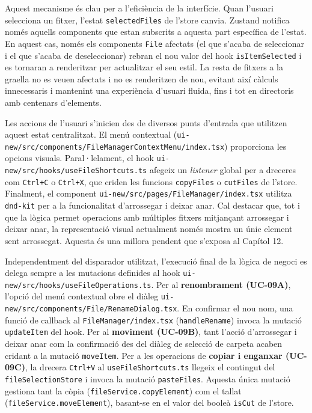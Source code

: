 Aquest mecanisme és clau per a l'eficiència de la interfície. Quan l'usuari selecciona un fitxer, l'estat \texttt{selectedFiles} de l'store canvia. Zustand notifica només aquells components que estan subscrits a aquesta part específica de l'estat. En aquest cas, només els components \texttt{File} afectats (el que s'acaba de seleccionar i el que s'acaba de deseleccionar) rebran el nou valor del hook \texttt{isItemSelected} i es tornaran a renderitzar per actualitzar el seu estil. La resta de fitxers a la graella no es veuen afectats i no es renderitzen de nou, evitant així càlculs innecessaris i mantenint una experiència d'usuari fluida, fins i tot en directoris amb centenars d'elements.

Les accions de l'usuari s'inicien des de diversos punts d'entrada que utilitzen aquest estat centralitzat. El menú contextual (\texttt{ui-new/src/components/FileManagerContextMenu/index.tsx}) proporciona les opcions visuals. Paral·lelament, el hook \texttt{ui-new/src/hooks/useFileShortcuts.ts} afegeix un \textit{listener} global per a dreceres com \texttt{Ctrl+C} o \texttt{Ctrl+X}, que criden les funcions \texttt{copyFiles} o \texttt{cutFiles} de l'store. Finalment, el component \texttt{ui-new/src/pages/FileManager/index.tsx} utilitza \texttt{dnd-kit} per a la funcionalitat d'arrossegar i deixar anar. Cal destacar que, tot i que la lògica permet operacions amb múltiples fitxers mitjançant arrossegar i deixar anar, la representació visual actualment només mostra un únic element sent arrossegat. Aquesta és una millora pendent que s'exposa al Capítol 12.

Independentment del disparador utilitzat, l'execució final de la lògica de negoci es delega sempre a les mutacions definides al hook \texttt{ui-new/src/hooks/useFileOperations.ts}. Per al \textbf{renombrament (UC-09A)}, l'opció del menú contextual obre el diàleg \texttt{ui-new/src/components/File/RenameDialog.tsx}. En confirmar el nou nom, una funció de callback al \texttt{FileManager/index.tsx} (\texttt{handleRename}) invoca la mutació \texttt{updateItem} del hook. Per al \textbf{moviment (UC-09B)}, tant l'acció d'arrossegar i deixar anar com la confirmació des del diàleg de selecció de carpeta acaben cridant a la mutació \texttt{moveItem}. Per a les operacions de \textbf{copiar i enganxar (UC-09C)}, la drecera \texttt{Ctrl+V} al \texttt{useFileShortcuts.ts} llegeix el contingut del \texttt{fileSelectionStore} i invoca la mutació \texttt{pasteFiles}. Aquesta única mutació gestiona tant la còpia (\texttt{fileService.copyElement}) com el tallat (\texttt{fileService.moveElement}), basant-se en el valor del booleà \texttt{isCut} de l'store.

